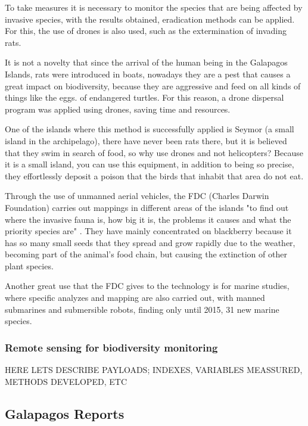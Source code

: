\documentclass[10pt,english, openany]{book}
\begin{document}
To take measures it is necessary to monitor the species that are being affected by invasive species, with the results obtained, eradication methods can be applied. For this, the use of drones is also used, such as the extermination of invading rats. \cite{Munoz2012}

It is not a novelty that since the arrival of the human being in the Galapagos Islands, rats were introduced in boats, nowadays they are a pest that causes a great impact on biodiversity, because they are aggressive and feed on all kinds of things like the eggs. of endangered turtles. For this reason, a drone dispersal program was applied using drones, saving time and resources.\cite{CarrereMichelle2019}

One of the islands where this method is successfully applied is Seymor (a small island in the archipelago), there have never been rats there, but it is believed that they swim in search of food, so why use drones and not helicopters? Because it is a small island, you can use this equipment, in addition to being so precise, they effortlessly deposit a poison that the birds that inhabit that area do not eat.\cite{BronchalMarina2019}

Through the use of unmanned aerial vehicles, the FDC (Charles Darwin Foundation) carries out mappings in different areas of the islands "to find out where the invasive fauna is, how big it is, the problems it causes and what the priority species are" \cite{LadinesRonald2019}. They have mainly concentrated on blackberry because it has so many small seeds that they spread and grow rapidly due to the weather, becoming part of the animal's food chain, but causing the extinction of other plant species.

Another great use that the FDC gives to the technology is for marine studies, where specific analyzes and mapping are also carried out, with manned submarines and submersible robots, finding only until 2015, 31 new marine species.\cite{LadinesRonald2019}

\subsubsection{Remote sensing for biodiversity monitoring}

HERE LETS DESCRIBE PAYLOADS; INDEXES, VARIABLES MEASSURED, METHODS DEVELOPED, ETC 

\subsection{Galapagos Reports}
\end{document}
